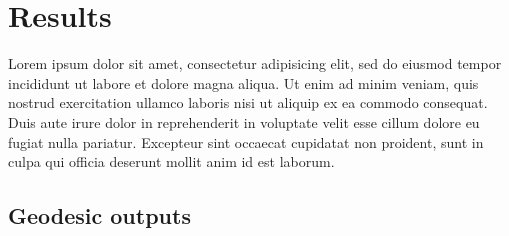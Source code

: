 \chapter{Results}
Lorem ipsum dolor sit amet, consectetur adipisicing elit, sed do eiusmod tempor incididunt ut labore et dolore magna aliqua. Ut enim ad minim veniam, quis nostrud exercitation ullamco laboris nisi ut aliquip ex ea commodo consequat. Duis aute irure dolor in reprehenderit in voluptate velit esse cillum dolore eu fugiat nulla pariatur. Excepteur sint occaecat cupidatat non proident, sunt in culpa qui officia deserunt mollit anim id est laborum.





\section{Geodesic outputs}

